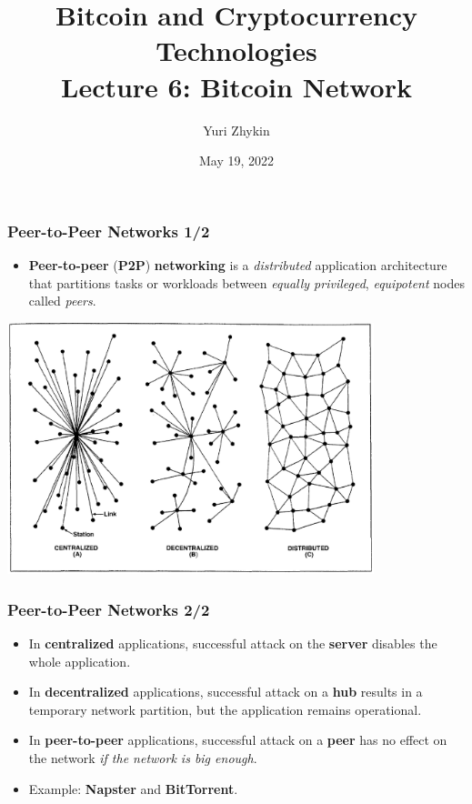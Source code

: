\documentclass{beamer}
\title{
  Bitcoin and Cryptocurrency Technologies \\
  Lecture 6: Bitcoin Network
}
\author{Yuri Zhykin}
\date{May 19, 2022}
\begin{document}
\frame{\titlepage}

\begin{frame}
  \frametitle{Peer-to-Peer Networks 1/2}
  \begin{itemize}
  \item \textbf{Peer-to-peer} (\textbf{P2P}) \textbf{networking} is a
    \textit{distributed} application architecture that partitions tasks or
    workloads between \textit{equally privileged}, \textit{equipotent} nodes
    called \textit{peers}.
  \end{itemize}
  \begin{center}
    \includegraphics[width=0.8\textwidth]{networks}
  \end{center}
\end{frame}

\begin{frame}
  \frametitle{Peer-to-Peer Networks 2/2}
  \begin{itemize}
  \item In \textbf{centralized} applications, successful attack on the
    \textbf{server} disables the whole application.
  \item In \textbf{decentralized} applications, successful attack on a
    \textbf{hub} results in a temporary network partition, but the application
    remains operational.
  \item In \textbf{peer-to-peer} applications, successful attack on a
    \textbf{peer} has no effect on the network \textit{if the network is big
      enough}.
  \item Example: \textbf{Napster} and \textbf{BitTorrent}.
  \end{itemize}
\end{frame}
\end{document}
